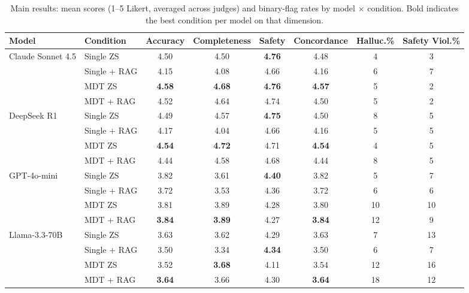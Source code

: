 \documentclass[final, 11pt, 3p]{elsarticle}
\begin{document}
\begin{table}[!ht]
\caption{Main results: mean scores (1--5 Likert, averaged across
judges) and binary-flag rates by model $\times$ condition. Bold
indicates the best condition per model on that dimension.}
\label{tab:main}
\centering
\small
\setlength{\tabcolsep}{4pt}
\begin{adjustbox}{max width=\linewidth}
\begin{tabular}{llcccccc}
\toprule
Model & Condition & Accuracy & Completeness & Safety & Concordance
  & Halluc.\% & Safety Viol.\% \\
\midrule
\multirow{4}{*}{Claude Sonnet 4.5}
  & Single ZS      & 4.50 & 4.50 & \textbf{4.76} & 4.48 & 4  & 3 \\
  & Single + RAG   & 4.15 & 4.08 & 4.66 & 4.16 & 6  & 7 \\
  & MDT ZS         & \textbf{4.58} & \textbf{4.68} & \textbf{4.76}
                   & \textbf{4.57} & 5  & 2 \\
  & MDT + RAG      & 4.52 & 4.64 & 4.74 & 4.50 & 5  & 2 \\
\midrule
\multirow{4}{*}{DeepSeek R1}
  & Single ZS      & 4.49 & 4.57 & \textbf{4.75} & 4.50 & 8  & 5 \\
  & Single + RAG   & 4.17 & 4.04 & 4.66 & 4.16 & 5  & 5 \\
  & MDT ZS         & \textbf{4.54} & \textbf{4.72} & 4.71 & \textbf{4.54} & 4 & 5 \\
  & MDT + RAG      & 4.44 & 4.58 & 4.68 & 4.44 & 8  & 5 \\
\midrule
\multirow{4}{*}{GPT-4o-mini}
  & Single ZS      & 3.82 & 3.61 & \textbf{4.40} & 3.82 & 5  & 7 \\
  & Single + RAG   & 3.72 & 3.53 & 4.36 & 3.72 & 6  & 6 \\
  & MDT ZS         & 3.81 & 3.89 & 4.28 & 3.80 & 10 & 10 \\
  & MDT + RAG      & \textbf{3.84} & \textbf{3.89} & 4.27 & \textbf{3.84} & 12 & 9 \\
\midrule
\multirow{4}{*}{Llama-3.3-70B}
  & Single ZS      & 3.63 & 3.62 & 4.29 & 3.63 & 7  & 13 \\
  & Single + RAG   & 3.50 & 3.34 & \textbf{4.34} & 3.50 & 6  & 7 \\
  & MDT ZS         & 3.52 & \textbf{3.68} & 4.11 & 3.54 & 12 & 16 \\
  & MDT + RAG      & \textbf{3.64} & 3.66 & 4.30 & \textbf{3.64} & 18 & 12 \\
\bottomrule
\end{tabular}
\end{adjustbox}
\end{table}
\end{document}
